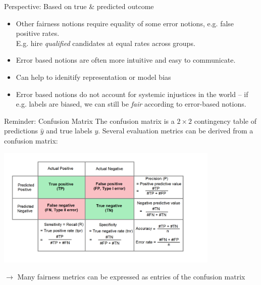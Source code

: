 \documentclass[11pt,compress,t,notes=noshow, xcolor=table]{beamer}
\begin{document}
\begin{vbframe}{Perspective: Based on true \& predicted outcome}
  \textbf{}
  \begin{itemize}
    \item Other fairness notions require equality of some error notions, e.g. false positive rates.\\
    E.g. hire \emph{qualified} candidates at equal rates across groups.
    \item Error based notions are often more intuitive and easy to communicate.
    \item Can help to idenitify representation or model bias
    \item Error based notions do not account for systemic injustices in the world -- if e.g. labels are biased, we can still be \emph{fair} according to error-based notions. 
  \end{itemize}
\end{vbframe}

\begin{vbframe}{Reminder: Confusion Matrix}
  The confusion matrix is a $2 \times 2$ contingency table of predictions $\hat{y}$ and true labels $y$.
  Several evaluation metrics can be derived from a confusion matrix:
  \vfill
  \begin{center}
  \includegraphics[width=0.8\textwidth]{figures/roc-confusion_matrix.png}
  \end{center}
  $\rightarrow$ Many fairness metrics can be expressed as entries of the confusion matrix
\end{vbframe}
   
\end{document}

